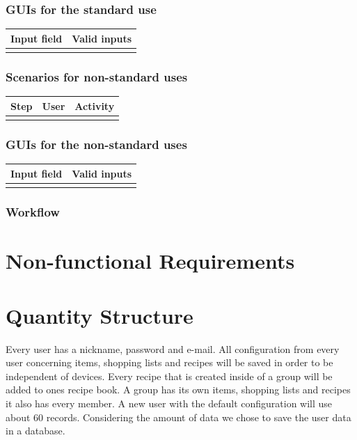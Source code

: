 \documentclass[12pt]{article}
\theoremstyle{definition}
\begin{document}
\subsubsection{GUIs for the standard use}

\begin{tabular}{|l|l|}
\hline
Input field & Valid inputs \\ \hline
 &  \\ \hline
\end{tabular}

\subsubsection{Scenarios for non-standard uses}

\begin{tabular}{|l|l|l|}
\hline
Step & User & Activity \\ \hline
 & & \\ \hline
\end{tabular}

\subsubsection{GUIs for the non-standard uses}

\begin{tabular}{|l|l|}
\hline
Input field & Valid inputs \\ \hline
 &  \\ \hline
\end{tabular}

\subsubsection{Workflow}

\pagebreak

\section{Non-functional Requirements}

\pagebreak

\section{Quantity Structure}

Every user has a nickname, password and e-mail. All configuration from every user concerning items, shopping lists and recipes will be saved in order to be independent of devices. Every recipe that is created inside of a group will be added to ones recipe book. A group has its own items, shopping lists and recipes it also has every member. A new user with the default configuration will use about 60 records. Considering the amount of data we chose to save the user data in a database. 
\end{document}
